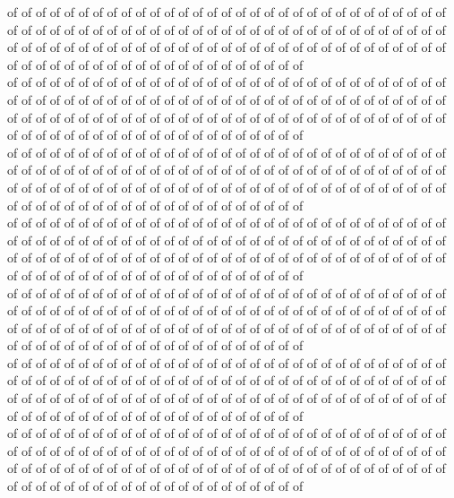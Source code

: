 of of of of of of of of of of of of of of of of of of of of of of of of of of of of of of of of of of of of of of of of of of of of of of of of of of of of of of of of of of of of of of of of of of of of of of of of of of of of of of of of of of of of of of of of of of of of of of of of of of of of of of of of of of of of of of of of of of\\
of of of of of of of of of of of of of of of of of of of of of of of of of of of of of of of of of of of of of of of of of of of of of of of of of of of of of of of of of of of of of of of of of of of of of of of of of of of of of of of of of of of of of of of of of of of of of of of of of of of of of of of of of of of of of of of of of of\\
of of of of of of of of of of of of of of of of of of of of of of of of of of of of of of of of of of of of of of of of of of of of of of of of of of of of of of of of of of of of of of of of of of of of of of of of of of of of of of of of of of of of of of of of of of of of of of of of of of of of of of of of of of of of of of of of of of\\
of of of of of of of of of of of of of of of of of of of of of of of of of of of of of of of of of of of of of of of of of of of of of of of of of of of of of of of of of of of of of of of of of of of of of of of of of of of of of of of of of of of of of of of of of of of of of of of of of of of of of of of of of of of of of of of of of of\\
of of of of of of of of of of of of of of of of of of of of of of of of of of of of of of of of of of of of of of of of of of of of of of of of of of of of of of of of of of of of of of of of of of of of of of of of of of of of of of of of of of of of of of of of of of of of of of of of of of of of of of of of of of of of of of of of of of\\
of of of of of of of of of of of of of of of of of of of of of of of of of of of of of of of of of of of of of of of of of of of of of of of of of of of of of of of of of of of of of of of of of of of of of of of of of of of of of of of of of of of of of of of of of of of of of of of of of of of of of of of of of of of of of of of of of of\\
of of of of of of of of of of of of of of of of of of of of of of of of of of of of of of of of of of of of of of of of of of of of of of of of of of of of of of of of of of of of of of of of of of of of of of of of of of of of of of of of of of of of of of of of of of of of of of of of of of of of of of of of of of of of of of of of of of\\
